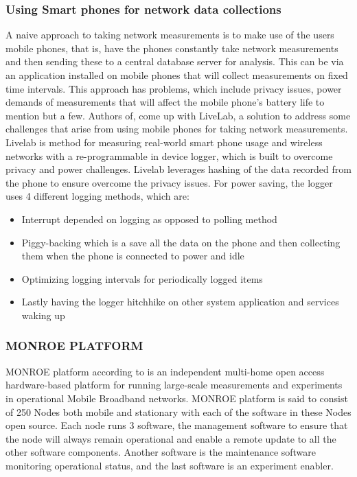 \subsubsection{Using Smart phones for network data collections}
A naive approach to taking network measurements is to make use of the users mobile phones, that is, have the phones constantly take network measurements and then sending these to a central database server for analysis.
This can be via an application installed on mobile phones that will collect measurements on fixed time intervals.
This approach has problems, which include privacy issues, power demands of measurements that will affect the mobile phone's battery life to mention but a few.
Authors of\cite{Shepard:2011:LMW:1925019.1925023}, come up with LiveLab, a solution to address some challenges that arise from using mobile phones for taking network measurements.
Livelab is method for measuring real-world smart phone usage and wireless networks with a re-programmable in device logger, which is built to overcome privacy and power challenges\cite{Wang:2015:MMA:2757290.2757291}.
Livelab leverages hashing of the data recorded from the phone to ensure overcome the privacy issues\cite{Shepard:2011:LMW:1925019.1925023}.
For power saving, the logger uses 4 different logging methods, which are\cite{Shepard:2011:LMW:1925019.1925023}:
\begin{itemize}
    \item Interrupt depended on logging as opposed to polling method
    \item Piggy-backing which is a save all the data on the phone and then collecting them when the phone is connected to power and idle
    \item Optimizing logging intervals for periodically logged items
    \item Lastly having the logger hitchhike on other system application and services waking up
\end{itemize}
\subsubsection{MONROE PLATFORM}
MONROE platform according to\cite{7523537} is an independent multi-home open access hardware-based platform for running large-scale measurements and experiments in operational Mobile Broadband networks.
MONROE platform is said to consist of 250 Nodes both mobile and stationary with each of the software in these Nodes open source\cite{8002921}.
Each node runs 3 software, the management software to ensure that the node will always remain operational and enable a remote update to all the other software components.
Another software is the maintenance software monitoring operational status, and the last software is an experiment enabler\cite{8002921}.
